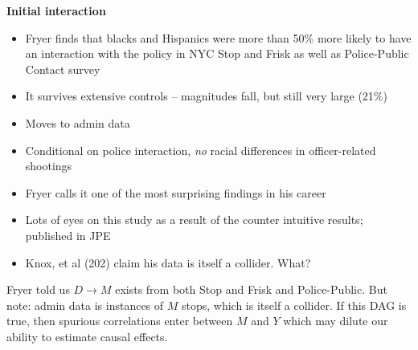 \documentclass[notes=show]{beamer}
\begin{document}
\begin{frame}[plain]
\begin{center}
\textbf{Initial interaction}
\end{center}

\begin{itemize}
\item Fryer finds that blacks and Hispanics were more than 50\% more likely to have an interaction with the policy in NYC Stop and Frisk as well as Police-Public Contact survey \item It survives extensive controls -- magnitudes fall, but still very large (21\%)
\item Moves to admin data 
\item Conditional on police interaction, \emph{no} racial differences in officer-related shootings
\item Fryer calls it one of the most surprising findings in his career
\item Lots of eyes on this study as a result of the counter intuitive results; published in JPE
\item Knox, et al (202) claim his data is itself a collider.  What?
\end{itemize}

\end{frame}

\begin{frame}[plain]

\begin{center}
\end{center}Fryer told us $D \rightarrow M$ exists from both Stop and Frisk and Police-Public.  But note: admin data is instances of $M$ stops, which is itself a collider. If this DAG is true, then spurious correlations enter between $M$ and $Y$ which may dilute our ability to estimate causal effects.

\end{frame}
\end{document}
